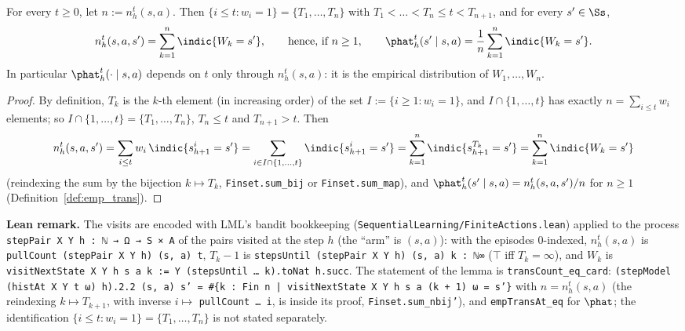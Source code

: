 \begin{lemma}\label{lem:emp_trans_reindex}
\leanok
{}
For every $t \ge 0$, let $n := n^t_h(s,a)$. Then $\{i \le t : w_i = 1\} = \{T_1, \dots, T_n\}$
with $T_1 < \dots < T_n \le t < T_{n+1}$, and for every $s' \in \Ss$,
\[
  n^t_h(s, a, s') = \sum_{k = 1}^{n}\indic\{W_k = s'\}, \qquad\text{hence, if } n \ge 1,\qquad
  \phat^t_h(s' \mid s, a) = \frac1n\sum_{k=1}^n\indic\{W_k = s'\} .
\]
In particular $\phat^t_h(\cdot \mid s,a)$ depends on $t$ only through $n^t_h(s,a)$: it is the
empirical distribution of $W_1, \dots, W_{n}$.
\end{lemma}

\begin{proof}
\leanok
By definition, $T_k$ is the $k$-th element (in increasing order) of the set
$I := \{i \ge 1 : w_i = 1\}$, and $I \cap \{1, \dots, t\}$ has exactly $n = \sum_{i \le t} w_i$
elements; so $I \cap \{1,\dots,t\} = \{T_1, \dots, T_n\}$, $T_n \le t$ and $T_{n+1} > t$. Then
\[
  n^t_h(s,a,s') = \sum_{i \le t} w_i\,\indic\{s^i_{h+1} = s'\}
  = \sum_{i \in I \cap \{1,\dots,t\}}\indic\{s^i_{h+1} = s'\}
  = \sum_{k=1}^n\indic\{s^{T_k}_{h+1} = s'\} = \sum_{k=1}^n\indic\{W_k = s'\}
\]
(reindexing the sum by the bijection $k \mapsto T_k$, \texttt{Finset.sum\_bij} or
\texttt{Finset.sum\_map}), and $\phat^t_h(s'\mid s,a) = n^t_h(s,a,s')/n$ for $n \ge 1$
(Definition~\ref{def:emp_trans}).
\end{proof}

\textbf{Lean remark.} The visits are encoded with LML's bandit bookkeeping
(\texttt{SequentialLearning/FiniteActions.lean}) applied to the process
\texttt{stepPair X Y h : ℕ → Ω → S × A} of the pairs visited at the step $h$ (the ``arm'' is
$(s, a)$): with the episodes $0$-indexed, $n^t_h(s,a)$ is \texttt{pullCount (stepPair X Y h) (s, a) t},
$T_k - 1$ is \texttt{stepsUntil (stepPair X Y h) (s, a) k : ℕ∞} ($\top$ iff $T_k = \infty$), and
$W_k$ is \texttt{visitNextState X Y h s a k := Y (stepsUntil … k).toNat h.succ}. The statement of
the lemma is \texttt{transCount\_eq\_card}:
\texttt{(stepModel (histAt X Y t ω) h).2.2 (s, a) s' = \#\{k : Fin n | visitNextState X Y h s a (k + 1) ω = s'\}}
with $n = n^t_h(s, a)$ (the reindexing $k \mapsto T_{k+1}$, with inverse
$i \mapsto$ \texttt{pullCount … i}, is inside its proof, \texttt{Finset.sum\_nbij'}), and
\texttt{empTransAt\_eq} for $\phat$; the identification $\{i \le t : w_i = 1\} = \{T_1, \dots, T_n\}$
is not stated separately.

